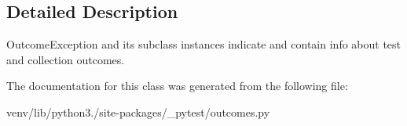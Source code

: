 \subsection{Detailed Description}
\begin{DoxyVerb}OutcomeException and its subclass instances indicate and
    contain info about test and collection outcomes.
\end{DoxyVerb}
 

The documentation for this class was generated from the following file\+:\begin{DoxyCompactItemize}
\item 
venv/lib/python3./site-\/packages/\+\_\+pytest/outcomes.\+py\end{DoxyCompactItemize}
